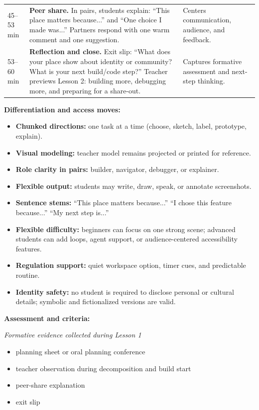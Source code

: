 \documentclass[11pt]{article}
\begin{document}
\begin{tabularx}{\textwidth}{
    L{0.05\textwidth}
    L{0.7\textwidth}
    L{0.25\textwidth}
}
45--53 min & \textbf{Peer share.} In pairs, students explain: ``This place matters because...'' and ``One choice I made was...'' Partners respond with one warm comment and one suggestion. & Centers communication, audience, and feedback. \\
53--60 min & \textbf{Reflection and close.} Exit slip: ``What does your place show about identity or community? What is your next build/code step?'' Teacher previews Lesson 2: building more, debugging more, and preparing for a share-out. & Captures formative assessment and next-step thinking. \\
\bottomrule
\end{tabularx}

\textbf{Differentiation and access moves:}
\begin{itemize}[leftmargin=*]
    \item \textbf{Chunked directions:} one task at a time (choose, sketch, label, prototype, explain).
    \item \textbf{Visual modeling:} teacher model remains projected or printed for reference.
    \item \textbf{Role clarity in pairs:} builder, navigator, debugger, or explainer.
    \item \textbf{Flexible output:} students may write, draw, speak, or annotate screenshots.
    \item \textbf{Sentence stems:} ``This place matters because...'' ``I chose this feature because...'' ``My next step is...''
    \item \textbf{Flexible difficulty:} beginners can focus on one strong scene; advanced students can add loops, agent support, or audience-centered accessibility features.
    \item \textbf{Regulation support:} quiet workspace option, timer cues, and predictable routine.
    \item \textbf{Identity safety:} no student is required to disclose personal or cultural details; symbolic and fictionalized versions are valid.
\end{itemize}

\textbf{Assessment and criteria:}

\textit{Formative evidence collected during Lesson 1}
\begin{itemize}[leftmargin=*]
    \item planning sheet or oral planning conference
    \item teacher observation during decomposition and build start
    \item peer-share explanation
    \item exit slip
\end{itemize}
\end{document}
